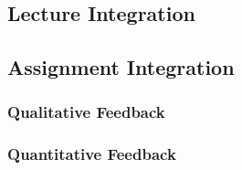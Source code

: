 
\subsection{Lecture Integration}

\subsection{Assignment Integration}

\subsubsection{Qualitative Feedback}

\subsubsection{Quantitative Feedback}


